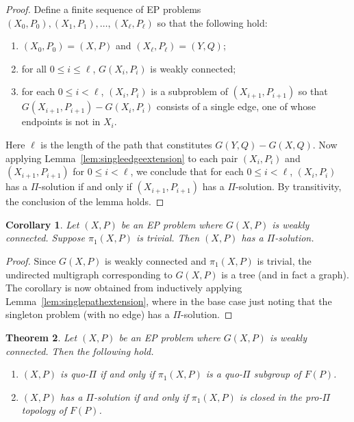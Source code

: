 \documentclass[10pt,a4paper]{amsart}
\newtheorem{theorem}{Theorem}[section]
\newtheorem{corollary}[theorem]{Corollary}
\theoremstyle{definition}
\theoremstyle{definition}
\numberwithin{equation}{section}
\begin{document}
\begin{proof} Define a finite sequence of EP problems $(X_0, P_0), (X_1, P_1), \dots, (X_\ell, P_\ell)$ so that the following hold:
\begin{enumerate}
\item[\rm (i)] $(X_0, P_0)=(X, P)$ and $(X_\ell, P_\ell)=(Y, Q)$;
\item[\rm (ii)] for all $0\leq i\leq \ell$, $G(X_i, P_i)$ is weakly connected;
\item[\rm (iii)] for each $0\leq i<\ell$, $(X_i, P_i)$ is a subproblem of $(X_{i+1}, P_{i+1})$ so that $G(X_{i+1}, P_{i+1})-G(X_i, P_i)$ consists of a single edge, one of whose endpoints is not in $X_i$.
\end{enumerate}
 Here $\ell$ is the length of the path that constitutes $G(Y, Q)-G(X, Q)$. Now applying Lemma~\ref{lem:singleedgeextension} to each pair $(X_i, P_i)$ and $(X_{i+1}, P_{i+1})$ for $0\leq i<\ell$, we conclude that for each $0\leq i<\ell$, $(X_i, P_i)$ has a $\Pi$-solution if and only if $(X_{i+1}, P_{i+1})$ has a $\Pi$-solution. By transitivity, the conclusion of the lemma holds.
\end{proof}


\begin{corollary}\label{cor:trivial} Let $(X, P)$ be an EP problem where $G(X, P)$ is weakly connected. Suppose $\pi_1(X, P)$ is trivial. Then $(X, P)$ has a $\Pi$-solution.
\end{corollary}

\begin{proof} Since $G(X, P)$ is weakly connected and $\pi_1(X, P)$ is trivial, the undirected multigraph corresponding to $G(X, P)$ is a tree (and in fact a graph). The corollary is now obtained from inductively applying Lemma~\ref{lem:singlepathextension}, where in the base case just noting that the singleton problem (with no edge) has a $\Pi$-solution.
\end{proof}


\begin{theorem}\label{thm:solutionprotopology} Let $(X, P)$ be an EP problem where $G(X, P)$ is weakly connected. Then the following hold.
\begin{enumerate}
\item[\rm (i)] $(X, P)$ is quo-$\Pi$ if and only if $\pi_1(X, P)$ is a quo-$\Pi$ subgroup of $F(P)$.
\item[\rm (ii)] $(X, P)$ has a $\Pi$-solution if and only if $\pi_1(X, P)$ is closed in the pro-$\Pi$ topology of $F(P)$.
\end{enumerate}
\end{theorem}
\end{document}

